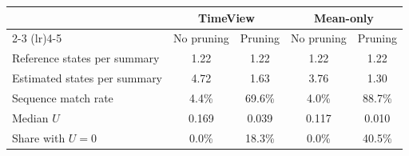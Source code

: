 \begin{tabular}{lcccc}
\toprule
 & \multicolumn{2}{c}{TimeView} & \multicolumn{2}{c}{Mean-only} \\
\cmidrule(lr){2-3} \cmidrule(lr){4-5}
 & No pruning & Pruning & No pruning & Pruning \\
\midrule
Reference states per summary & 1.22 & 1.22 & 1.22 & 1.22 \\
Estimated states per summary & 4.72 & 1.63 & 3.76 & 1.30 \\
Sequence match rate & 4.4\% & 69.6\% & 4.0\% & 88.7\% \\
\addlinespace
Median $U$ & 0.169 & 0.039 & 0.117 & 0.010 \\
Share with $U = 0$ & 0.0\% & 18.3\% & 0.0\% & 40.5\% \\
\bottomrule
\end{tabular}
